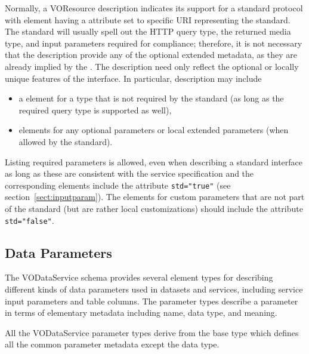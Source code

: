 \documentclass[11pt,a4paper]{ivoa}
\begin{document}
Normally, a VOResource
description indicates its support for a standard protocol with
 element having a
 attribute set to specific URI representing the
standard.  The standard will usually spell out the HTTP query type,
the returned media type, and input parameters required for compliance;
therefore, it is not necessary that the 
description provide any of the optional extended metadata, as they are
already implied by the .  The description need
only reflect the optional or locally unique features of the
interface.  In particular, description may include


\begin{itemize}
\item a  element for a type that is not
  required by the standard (as long as the required query type is
  supported as well),

\item {}\/ elements for any optional parameters
       or local extended parameters (when allowed by the standard).
\end{itemize}


Listing required parameters is allowed, even when
describing a standard interface as long as these are consistent with
the service specification and the corresponding 
elements include the attribute \verb|std="true"| (see
section~\ref{sect:inputparam}).  The 
elements for custom parameters that are not part of the standard (but
are rather local customizations) should include the attribute
\verb|std="false"|.





\subsection{Data Parameters}
\label{sect:param}


The VODataService schema provides several element types for describing
different kinds of data parameters used in datasets and services,
including service input parameters and table columns.  The parameter
types describe a parameter in terms of elementary metadata
including name, data type, and meaning.  


All the VODataService parameter types derive from the base type 
 which defines all the common parameter
metadata except the data type.  
\end{document}
